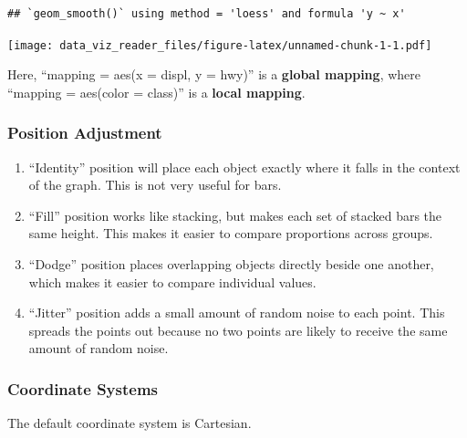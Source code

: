 \documentclass[]{book}
\providecommand{\tightlist}{%
  \setlength{\itemsep}{0pt}\setlength{\parskip}{0pt}}
\begin{document}
\begin{verbatim}
## `geom_smooth()` using method = 'loess' and formula 'y ~ x'
\end{verbatim}

\texttt{[image: data\_viz\_reader\_files/figure-latex/unnamed-chunk-1-1.pdf]}

Here, ``mapping = aes(x = displ, y = hwy)'' is a \textbf{global mapping}, where ``mapping = aes(color = class)'' is a \textbf{local mapping}.

\hypertarget{position-adjustment}{%
\subsubsection{Position Adjustment}\label{position-adjustment}}

\begin{enumerate}
\def\labelenumi{\alph{enumi})}
\tightlist
\item
  ``Identity'' position will place each object exactly where it falls in the context of the graph. This is not very useful for bars.
\item
  ``Fill'' position works like stacking, but makes each set of stacked bars the same height. This makes it easier to compare proportions across groups.
\item
  ``Dodge'' position places overlapping objects directly beside one another, which makes it easier to compare individual values.
\item
  ``Jitter'' position adds a small amount of random noise to each point. This spreads the points out because no two points are likely to receive the same amount of random noise.
\end{enumerate}

\hypertarget{coordinate-systems}{%
\subsubsection{Coordinate Systems}\label{coordinate-systems}}

The default coordinate system is Cartesian.
\end{document}
